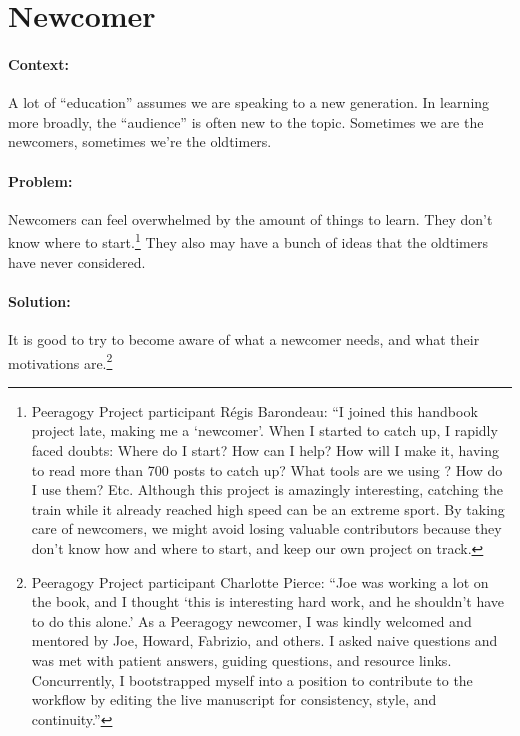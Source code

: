 \section{Newcomer}
\paragraph{Context:}
A lot of ``education'' assumes we are speaking to a new generation. 
In learning more broadly, the ``audience'' is often new to the topic.
Sometimes we are the newcomers, sometimes we're the oldtimers.

\paragraph{Problem:} Newcomers can feel overwhelmed by the amount of things to learn.  They
don't know where to start.\footnote{Peeragogy Project participant
R\'egis Barondeau: ``I joined this handbook project late, making me
a `newcomer'. When I started to catch up, I rapidly faced doubts:
Where do I start? How can I help? How will I make it, having to read
more than 700 posts to catch up? What tools are we using ? How do I use
them? Etc. Although this project is amazingly interesting, catching the
train while it already reached high speed can be an extreme sport. By
taking care of newcomers, we might avoid losing valuable contributors
because they don't know how and where to start, and keep our own project
on track.}  They also may have a bunch of ideas that the oldtimers have
never considered.

\paragraph{Solution:} It is good to try to become aware of what a newcomer
needs, and what their motivations are.\footnote{Peeragogy Project participant
Charlotte Pierce: ``Joe was working a lot on the book, and I thought
`this is interesting hard work, and he shouldn't have to do
this alone.' As a Peeragogy newcomer, I was kindly welcomed and
mentored by Joe, Howard, Fabrizio, and others. I asked naive questions
and was met with patient answers, guiding questions, and resource links.
Concurrently, I bootstrapped myself into a position to contribute to the
workflow by editing the live manuscript for consistency, style, and continuity.''}

